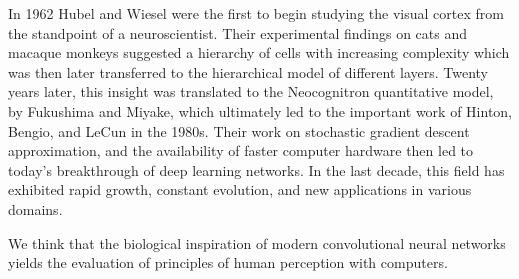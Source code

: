 In 1962 Hubel and Wiesel were the first to begin studying the visual cortex from the standpoint of a neuroscientist. Their experimental findings on cats and macaque monkeys suggested a hierarchy of cells with increasing complexity which was then later transferred to the hierarchical model of different layers. Twenty years later, this insight was translated to the Neocognitron quantitative model, by Fukushima and Miyake, which ultimately led to the important work of Hinton, Bengio, and LeCun in the 1980s. Their work on stochastic gradient descent approximation, and the availability of faster computer hardware then led to today’s breakthrough of deep learning networks. In the last decade, this field has exhibited rapid growth, constant evolution, and new applications in various domains.

We think that the biological inspiration of modern convolutional neural networks yields the evaluation of principles of human perception with computers.


